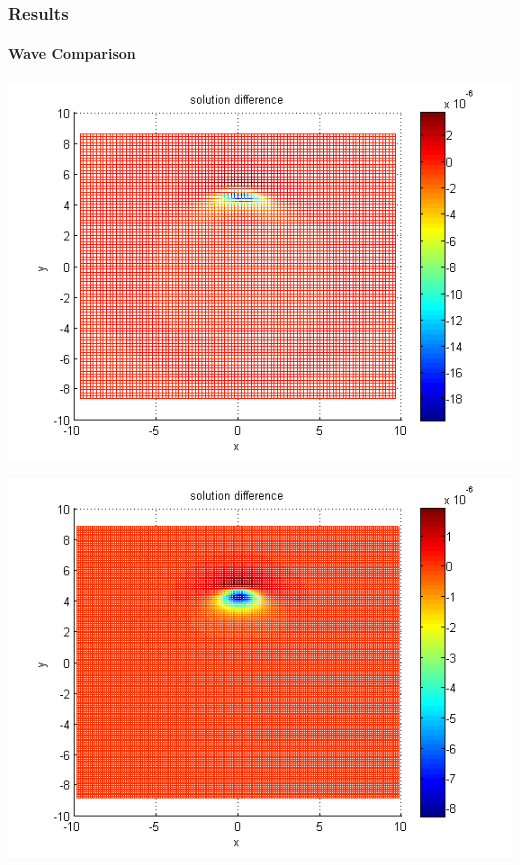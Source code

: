 \documentclass{beamer}
\begin{document}
\begin{frame}
\frametitle{Results}
\framesubtitle{Wave Comparison}
\begin{center}\vspace{0.4cm}
	\begin{minipage}[b]{0.32\linewidth}
		 \includegraphics[width=\linewidth]{../amitans/figures/compare_30_bt3_c045_h020.png}
	\end{minipage}	
	\begin{minipage}[b]{0.32\linewidth}
		\includegraphics[width=\linewidth]{../amitans/figures/compare_30_bt3_c045_h010.png}
	\end{minipage}	
	\begin{minipage}[b]{0.32\linewidth}		

\end{minipage}
\end{center}
\end{frame}
\end{document}
